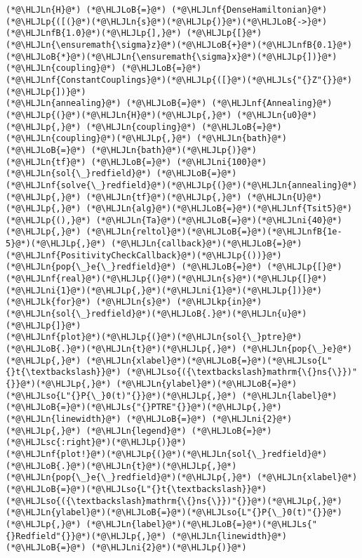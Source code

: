 \documentclass[12pt,a4paper]{article}
\newcommand{\HLJLk}[1]{\textcolor[RGB]{148,91,176}{\textbf{#1}}}
\newcommand{\HLJLkp}[1]{\textcolor[RGB]{148,91,176}{\textbf{#1}}}
\newcommand{\HLJLn}[1]{#1}
\newcommand{\HLJLnf}[1]{\textcolor[RGB]{66,102,213}{#1}}
\newcommand{\HLJLs}[1]{\textcolor[RGB]{201,61,57}{#1}}
\newcommand{\HLJLsc}[1]{\textcolor[RGB]{201,61,57}{#1}}
\newcommand{\HLJLso}[1]{\textcolor[RGB]{201,61,57}{#1}}
\newcommand{\HLJLnfB}[1]{\textcolor[RGB]{59,151,46}{#1}}
\newcommand{\HLJLni}[1]{\textcolor[RGB]{59,151,46}{#1}}
\newcommand{\HLJLoB}[1]{\textcolor[RGB]{102,102,102}{\textbf{#1}}}
\newcommand{\HLJLp}[1]{#1}
\begin{document}
\begin{lstlisting}
(*@\HLJLn{H}@*) (*@\HLJLoB{=}@*) (*@\HLJLnf{DenseHamiltonian}@*)(*@\HLJLp{([(}@*)(*@\HLJLn{s}@*)(*@\HLJLp{)}@*)(*@\HLJLoB{->}@*)(*@\HLJLnfB{1.0}@*)(*@\HLJLp{],}@*) (*@\HLJLp{[}@*)(*@\HLJLn{\ensuremath{\sigma}z}@*)(*@\HLJLoB{+}@*)(*@\HLJLnfB{0.1}@*)(*@\HLJLoB{*}@*)(*@\HLJLn{\ensuremath{\sigma}x}@*)(*@\HLJLp{])}@*)
(*@\HLJLn{coupling}@*) (*@\HLJLoB{=}@*) (*@\HLJLnf{ConstantCouplings}@*)(*@\HLJLp{([}@*)(*@\HLJLs{"{}Z"{}}@*)(*@\HLJLp{])}@*)
(*@\HLJLn{annealing}@*) (*@\HLJLoB{=}@*) (*@\HLJLnf{Annealing}@*)(*@\HLJLp{(}@*)(*@\HLJLn{H}@*)(*@\HLJLp{,}@*) (*@\HLJLn{u0}@*)(*@\HLJLp{,}@*) (*@\HLJLn{coupling}@*) (*@\HLJLoB{=}@*) (*@\HLJLn{coupling}@*)(*@\HLJLp{,}@*) (*@\HLJLn{bath}@*) (*@\HLJLoB{=}@*) (*@\HLJLn{bath}@*)(*@\HLJLp{)}@*)
(*@\HLJLn{tf}@*) (*@\HLJLoB{=}@*) (*@\HLJLni{100}@*)
(*@\HLJLn{sol{\_}redfield}@*) (*@\HLJLoB{=}@*) (*@\HLJLnf{solve{\_}redfield}@*)(*@\HLJLp{(}@*)(*@\HLJLn{annealing}@*)(*@\HLJLp{,}@*) (*@\HLJLn{tf}@*)(*@\HLJLp{,}@*) (*@\HLJLn{U}@*)(*@\HLJLp{,}@*) (*@\HLJLn{alg}@*)(*@\HLJLoB{=}@*)(*@\HLJLnf{Tsit5}@*)(*@\HLJLp{(),}@*) (*@\HLJLn{Ta}@*)(*@\HLJLoB{=}@*)(*@\HLJLni{40}@*)(*@\HLJLp{,}@*) (*@\HLJLn{reltol}@*)(*@\HLJLoB{=}@*)(*@\HLJLnfB{1e-5}@*)(*@\HLJLp{,}@*) (*@\HLJLn{callback}@*)(*@\HLJLoB{=}@*)(*@\HLJLnf{PositivityCheckCallback}@*)(*@\HLJLp{())}@*)
(*@\HLJLn{pop{\_}e{\_}redfield}@*) (*@\HLJLoB{=}@*) (*@\HLJLp{[}@*)(*@\HLJLnf{real}@*)(*@\HLJLp{(}@*)(*@\HLJLn{s}@*)(*@\HLJLp{[}@*)(*@\HLJLni{1}@*)(*@\HLJLp{,}@*)(*@\HLJLni{1}@*)(*@\HLJLp{])}@*) (*@\HLJLk{for}@*) (*@\HLJLn{s}@*) (*@\HLJLkp{in}@*) (*@\HLJLn{sol{\_}redfield}@*)(*@\HLJLoB{.}@*)(*@\HLJLn{u}@*)(*@\HLJLp{]}@*)
(*@\HLJLnf{plot}@*)(*@\HLJLp{(}@*)(*@\HLJLn{sol{\_}ptre}@*)(*@\HLJLoB{.}@*)(*@\HLJLn{t}@*)(*@\HLJLp{,}@*) (*@\HLJLn{pop{\_}e}@*)(*@\HLJLp{,}@*) (*@\HLJLn{xlabel}@*)(*@\HLJLoB{=}@*)(*@\HLJLso{L"{}t{\textbackslash}}@*) (*@\HLJLso{({\textbackslash}mathrm{\{}ns{\}})"{}}@*)(*@\HLJLp{,}@*) (*@\HLJLn{ylabel}@*)(*@\HLJLoB{=}@*)(*@\HLJLso{L"{}P{\_}0(t)"{}}@*)(*@\HLJLp{,}@*) (*@\HLJLn{label}@*)(*@\HLJLoB{=}@*)(*@\HLJLs{"{}PTRE"{}}@*)(*@\HLJLp{,}@*) (*@\HLJLn{linewidth}@*) (*@\HLJLoB{=}@*) (*@\HLJLni{2}@*)(*@\HLJLp{,}@*) (*@\HLJLn{legend}@*) (*@\HLJLoB{=}@*) (*@\HLJLsc{:right}@*)(*@\HLJLp{)}@*)
(*@\HLJLnf{plot!}@*)(*@\HLJLp{(}@*)(*@\HLJLn{sol{\_}redfield}@*)(*@\HLJLoB{.}@*)(*@\HLJLn{t}@*)(*@\HLJLp{,}@*) (*@\HLJLn{pop{\_}e{\_}redfield}@*)(*@\HLJLp{,}@*) (*@\HLJLn{xlabel}@*)(*@\HLJLoB{=}@*)(*@\HLJLso{L"{}t{\textbackslash}}@*) (*@\HLJLso{({\textbackslash}mathrm{\{}ns{\}})"{}}@*)(*@\HLJLp{,}@*) (*@\HLJLn{ylabel}@*)(*@\HLJLoB{=}@*)(*@\HLJLso{L"{}P{\_}0(t)"{}}@*)(*@\HLJLp{,}@*) (*@\HLJLn{label}@*)(*@\HLJLoB{=}@*)(*@\HLJLs{"{}Redfield"{}}@*)(*@\HLJLp{,}@*) (*@\HLJLn{linewidth}@*) (*@\HLJLoB{=}@*) (*@\HLJLni{2}@*)(*@\HLJLp{)}@*)
\end{lstlisting}
\end{document}
